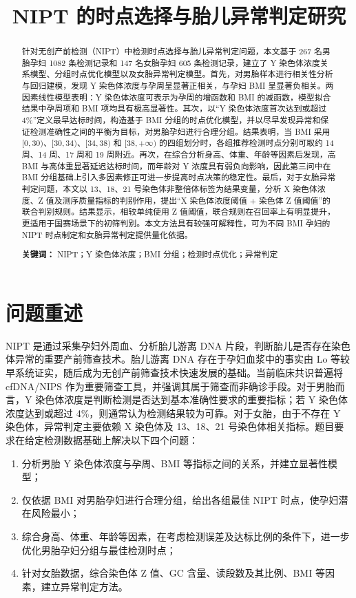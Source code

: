 ﻿\documentclass[12pt,a4paper]{article}
\title{NIPT 的时点选择与胎儿异常判定研究}
\date{}
\begin{document}
\maketitle

\begin{abstract}
针对无创产前检测（NIPT）中检测时点选择与胎儿异常判定问题，本文基于 267 名男胎孕妇 1082 条检测记录和 147 名女胎孕妇 605 条检测记录，建立了 Y 染色体浓度关系模型、分组时点优化模型以及女胎异常判定模型。首先，对男胎样本进行相关性分析与回归建模，发现 Y 染色体浓度与孕周呈显著正相关，与孕妇 BMI 呈显著负相关。两因素线性模型表明：Y 染色体浓度可表示为孕周的增函数和 BMI 的减函数，模型拟合结果中孕周项和 BMI 项均具有极高显著性。其次，以“Y 染色体浓度首次达到或超过 4\%”定义最早达标时间，构造基于 BMI 分组的时点优化模型，并以尽早发现异常和保证检测准确性之间的平衡为目标，对男胎孕妇进行合理分组。结果表明，当 BMI 采用 $[0,30)$、$[30,34)$、$[34,38)$ 和 $[38,+\infty)$ 的四组划分时，各组推荐检测时点分别可取约 14 周、14 周、17 周和 19 周附近。再次，在综合分析身高、体重、年龄等因素后发现，高 BMI 与高体重显著延迟达标时间，而年龄对 Y 浓度具有弱负向影响，因此第三问中在 BMI 分组基础上引入多因素修正可进一步提高时点决策的稳定性。最后，对于女胎异常判定问题，本文以 13、18、21 号染色体非整倍体标签为结果变量，分析 X 染色体浓度、Z 值及测序质量指标的判别作用，提出“X 染色体浓度阈值 + 染色体 Z 值阈值”的联合判别规则。结果显示，相较单纯使用 Z 值阈值，联合规则在召回率上有明显提升，更适用于国赛场景下的初筛判别。本文方法具有较强可解释性，可为不同 BMI 孕妇的 NIPT 时点制定和女胎异常判定提供量化依据。

\noindent\textbf{关键词：} NIPT；Y 染色体浓度；BMI 分组；检测时点优化；异常判定
\end{abstract}

\section{问题重述}
NIPT 是通过采集孕妇外周血、分析胎儿游离 DNA 片段，判断胎儿是否存在染色体异常的重要产前筛查技术。胎儿游离 DNA 存在于孕妇血浆中的事实由 Lo 等较早系统证实，随后成为无创产前筛查技术快速发展的基础\cite{ref-lo1997,ref-lo1998,ref-bianchi2017}。当前临床共识普遍将 cfDNA/NIPS 作为重要筛查工具，并强调其属于筛查而非确诊手段\cite{ref-acmg2023,ref-acog2026}。对于男胎而言，Y 染色体浓度是判断检测是否达到基本准确性要求的重要指标；若 Y 染色体浓度达到或超过 4\%，则通常认为检测结果较为可靠。对于女胎，由于不存在 Y 染色体，异常判定主要依赖 X 染色体及 13、18、21 号染色体相关指标。题目要求在给定检测数据基础上解决以下四个问题：

\begin{enumerate}
    \item 分析男胎 Y 染色体浓度与孕周、BMI 等指标之间的关系，并建立显著性模型；
    \item 仅依据 BMI 对男胎孕妇进行合理分组，给出各组最佳 NIPT 时点，使孕妇潜在风险最小；
    \item 综合身高、体重、年龄等因素，在考虑检测误差及达标比例的条件下，进一步优化男胎孕妇分组与最佳检测时点；
    \item 针对女胎数据，综合染色体 Z 值、GC 含量、读段数及其比例、BMI 等因素，建立异常判定方法。
\end{enumerate}
\end{document}
